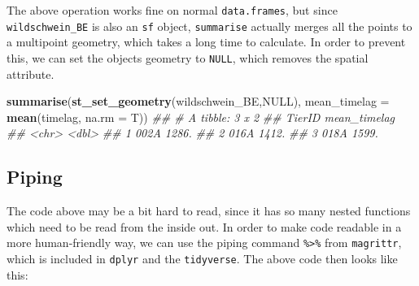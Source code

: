 \documentclass[]{book}
\newenvironment{Shaded}{\begin{snugshade}}{\end{snugshade}}
\newcommand{\CommentTok}[1]{\textcolor[rgb]{0.56,0.35,0.01}{\textit{#1}}}
\newcommand{\DataTypeTok}[1]{\textcolor[rgb]{0.13,0.29,0.53}{#1}}
\newcommand{\KeywordTok}[1]{\textcolor[rgb]{0.13,0.29,0.53}{\textbf{#1}}}
\newcommand{\NormalTok}[1]{#1}
\newcommand{\OperatorTok}[1]{\textcolor[rgb]{0.81,0.36,0.00}{\textbf{#1}}}
\newcommand{\OtherTok}[1]{\textcolor[rgb]{0.56,0.35,0.01}{#1}}
\newcommand{\StringTok}[1]{\textcolor[rgb]{0.31,0.60,0.02}{#1}}
\begin{document}
The above operation works fine on normal \texttt{data.frames}, but since \texttt{wildschwein\_BE} is also an \texttt{sf} object, \texttt{summarise} actually merges all the points to a multipoint geometry, which takes a long time to calculate. In order to prevent this, we can set the objects geometry to \texttt{NULL}, which removes the spatial attribute.

\begin{Shaded}
\begin{Highlighting}[]

\KeywordTok{summarise}\NormalTok{(}\KeywordTok{st_set_geometry}\NormalTok{(wildschwein_BE,}\OtherTok{NULL}\NormalTok{), }\DataTypeTok{mean_timelag =} \KeywordTok{mean}\NormalTok{(timelag, }\DataTypeTok{na.rm =}\NormalTok{ T))}
\CommentTok{## # A tibble: 3 x 2}
\CommentTok{##   TierID mean_timelag}
\CommentTok{##   <chr>         <dbl>}
\CommentTok{## 1 002A          1286.}
\CommentTok{## 2 016A          1412.}
\CommentTok{## 3 018A          1599.}
\end{Highlighting}
\end{Shaded}

\hypertarget{piping}{%
\subsection{Piping}\label{piping}}

The code above may be a bit hard to read, since it has so many nested functions which need to be read from the inside out. In order to make code readable in a more human-friendly way, we can use the piping command \texttt{\%\textgreater{}\%} from \texttt{magrittr}, which is included in \texttt{dplyr} and the \texttt{tidyverse}. The above code then looks like this:

\begin{Shaded}
\end{Shaded}
\end{document}
